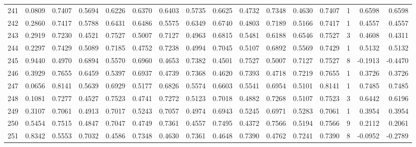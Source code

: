 \begin{tabular}{lrrrrrrrrrrrrrrr}
241 &      0.0809 &  0.7407 &  0.5694 &  0.6226 &  0.6370 &  0.6403 &  0.5735 &  0.6625 &  0.4732 &  0.7348 &   0.4630 &     0.7407 &      1 &                    0.6598 &                     0.6598 \\
242 &      0.2860 &  0.7417 &  0.5788 &  0.6431 &  0.6486 &  0.5575 &  0.6349 &  0.6740 &  0.4803 &  0.7189 &   0.5166 &     0.7417 &      1 &                    0.4557 &                     0.4557 \\
243 &      0.2919 &  0.7230 &  0.4521 &  0.7527 &  0.5007 &  0.7127 &  0.4963 &  0.6815 &  0.5481 &  0.6188 &   0.6546 &     0.7527 &      3 &                    0.4608 &                     0.4311 \\
244 &      0.2297 &  0.7429 &  0.5089 &  0.7185 &  0.4752 &  0.7238 &  0.4994 &  0.7045 &  0.5107 &  0.6892 &   0.5569 &     0.7429 &      1 &                    0.5132 &                     0.5132 \\
245 &      0.9440 &  0.4970 &  0.6894 &  0.5570 &  0.6960 &  0.4653 &  0.7382 &  0.4501 &  0.7527 &  0.5007 &   0.7127 &     0.7527 &      8 &                   -0.1913 &                    -0.4470 \\
246 &      0.3929 &  0.7655 &  0.6459 &  0.5397 &  0.6937 &  0.4739 &  0.7368 &  0.4620 &  0.7393 &  0.4718 &   0.7219 &     0.7655 &      1 &                    0.3726 &                     0.3726 \\
247 &      0.0656 &  0.8141 &  0.5639 &  0.6929 &  0.5177 &  0.6826 &  0.5574 &  0.6603 &  0.5541 &  0.6954 &   0.5101 &     0.8141 &      1 &                    0.7485 &                     0.7485 \\
248 &      0.1081 &  0.7277 &  0.4527 &  0.7523 &  0.4741 &  0.7272 &  0.5123 &  0.7018 &  0.4882 &  0.7268 &   0.5107 &     0.7523 &      3 &                    0.6442 &                     0.6196 \\
249 &      0.3107 &  0.7061 &  0.4913 &  0.7017 &  0.5243 &  0.7057 &  0.4974 &  0.6943 &  0.5245 &  0.6971 &   0.5283 &     0.7061 &      1 &                    0.3954 &                     0.3954 \\
250 &      0.5454 &  0.7515 &  0.4847 &  0.7047 &  0.4749 &  0.7361 &  0.4557 &  0.7495 &  0.4372 &  0.7566 &   0.5194 &     0.7566 &      9 &                    0.2112 &                     0.2061 \\
251 &      0.8342 &  0.5553 &  0.7032 &  0.4586 &  0.7348 &  0.4630 &  0.7361 &  0.4648 &  0.7390 &  0.4762 &   0.7241 &     0.7390 &      8 &                   -0.0952 &                    -0.2789 \\

\end{tabular}

